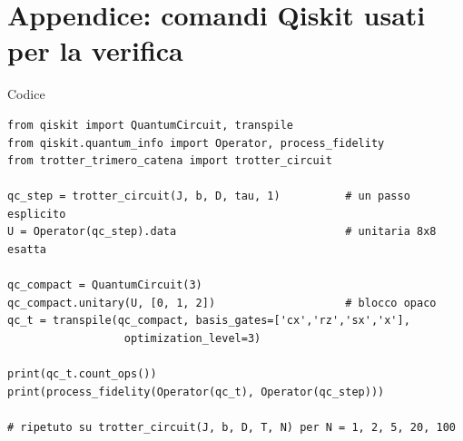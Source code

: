 \documentclass[11pt,a4paper]{article}
\begin{document}
\section*{Appendice: comandi Qiskit usati per la verifica}

\begin{panelbox}{Codice}
\small
\begin{verbatim}
from qiskit import QuantumCircuit, transpile
from qiskit.quantum_info import Operator, process_fidelity
from trotter_trimero_catena import trotter_circuit

qc_step = trotter_circuit(J, b, D, tau, 1)          # un passo esplicito
U = Operator(qc_step).data                          # unitaria 8x8 esatta

qc_compact = QuantumCircuit(3)
qc_compact.unitary(U, [0, 1, 2])                    # blocco opaco
qc_t = transpile(qc_compact, basis_gates=['cx','rz','sx','x'],
                  optimization_level=3)

print(qc_t.count_ops())
print(process_fidelity(Operator(qc_t), Operator(qc_step)))

# ripetuto su trotter_circuit(J, b, D, T, N) per N = 1, 2, 5, 20, 100
\end{verbatim}
\end{panelbox}
\end{document}

